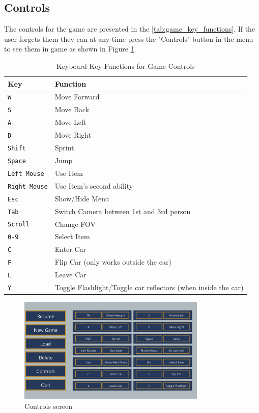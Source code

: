 \subsection{Controls}
The controls for the game are presented in the \autoref{tab:game_key_functions}.
If the user forgets them they can at any time press the "Controls" button in the menu to see them in game as shown in Figure \ref{fig:controls}.

\begin{table}[h]
    \centering
    \begin{tabular}{|m{3cm}|m{8cm}|}
    \hline
    \textbf{Key} & \textbf{Function} \\
    \hline
    \texttt{W} & Move Forward \\
    \hline
    \texttt{S} & Move Back \\
    \hline
    \texttt{A} & Move Left \\
    \hline
    \texttt{D} & Move Right \\
    \hline
    \texttt{Shift} & Sprint \\
    \hline
    \texttt{Space} & Jump \\
    \hline
    \texttt{Left Mouse} & Use Item \\
    \hline
    \texttt{Right Mouse} & Use Item's second ability \\
    \hline
    \texttt{Esc} & Show/Hide Menu \\
    \hline
    \texttt{Tab} & Switch Camera between 1st and 3rd person \\
    \hline
    \texttt{Scroll} & Change FOV \\
    \hline
    \texttt{0-9} & Select Item \\
    \hline
    \texttt{C} & Enter Car \\
    \hline
    \texttt{F} & Flip Car (only works outside the car) \\
    \hline
    \texttt{L} & Leave Car \\
    \hline
    \texttt{Y} & Toggle Flashlight/Toggle car reflectors (when inside the car) \\
    \hline
    \end{tabular}
    \caption{Keyboard Key Functions for Game Controls}
    \label{tab:game_key_functions}
\end{table}

\begin{figure}[H]
    \centering
    \includegraphics[width=0.8\textwidth]{sections/user_manual/resources/controls.png}
    \caption{Controls screen}
    \label{fig:controls}
\end{figure}
